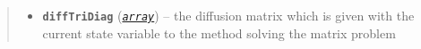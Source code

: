 \documentclass[a4paper,10pt,english]{sphinxmanual}
\begin{document}
\begin{fulllineitems}
\begin{fulllineitems}
\begin{quote}
\begin{description}
\begin{itemize}
\item {} 
\textbf{\texttt{diffTriDiag}} (\href{http://docs.python.org/2.7/library/array.html\#module-array}{\emph{\texttt{array}}}) -- the diffusion matrix which is given 
with the current state variable to 
the method solving the matrix problem

\end{itemize}

\end{description}\end{quote}

\end{fulllineitems}


\end{fulllineitems}

\end{document}
